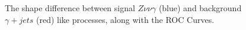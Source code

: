 \begin{figure}[!h]
 \caption{ The shape difference between signal $Z\nu\nu\gamma$ (blue) and background $\gamma + jets$ (red) like processes, along with the ROC Curves. }
 \label{fig:perform}
\end{figure}






 



